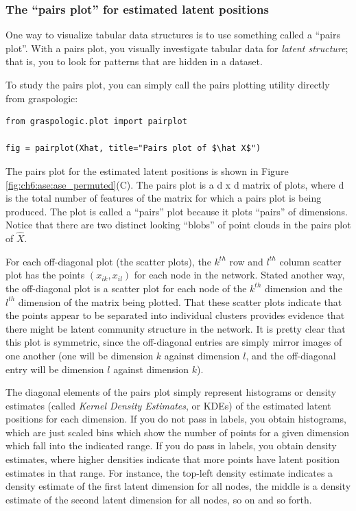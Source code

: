 \subsubsection*{The ``pairs plot'' for estimated latent positions}
\label{sec:ch6:ase:reorder}
One way to visualize tabular data structures is to use something called a ``pairs plot''. With a pairs plot, you visually investigate tabular data for \textit{latent structure}; that is, you to look for patterns that are hidden in a dataset.

To study the pairs plot, you can simply call the pairs plotting utility directly from graspologic:

\begin{lstlisting}[style=python]
from graspologic.plot import pairplot

fig = pairplot(Xhat, title="Pairs plot of $\hat X$")
\end{lstlisting}

The pairs plot for the estimated latent positions is shown in Figure \ref{fig:ch6:ase:ase_permuted}(C). The pairs plot is a d x d matrix of plots, where d is the total number of features of the matrix for which a pairs plot is being produced. The plot is called a ``pairs'' plot because it plots “pairs” of dimensions. Notice that there are two distinct looking ``blobs'' of point clouds in the pairs plot of $\hat X$.

For each off-diagonal plot (the scatter plots), the $k^{th}$ row and $l^{th}$ column scatter plot has the points $(x_{ik}, x_{il})$ for each node in the network. Stated another way, the off-diagonal plot is a scatter plot for each node of the $k^{th}$ dimension and the $l^{th}$ dimension of the matrix being plotted. That these scatter plots indicate that the points appear to be separated into individual clusters provides evidence that there might be latent community structure in the network. It is pretty clear that this plot is symmetric, since the off-diagonal entries are simply mirror images of one another (one will be dimension $k$ against dimension $l$, and the off-diagonal entry will be dimension $l$ against dimension $k$).

The diagonal elements of the pairs plot simply represent histograms or density estimates (called \textit{Kernel Density Estimates}, or KDEs) of the estimated latent positions for each dimension. If you do not pass in labels, you obtain histograms, which are just scaled bins which show the number of points for a given dimension which fall into the indicated range. If you do pass in labels, you obtain density estimates, where higher densities indicate that more points have latent position estimates in that range. For instance, the top-left density estimate indicates a density estimate of the first latent dimension for all nodes, the middle is a density estimate of the second latent dimension for all nodes, so on and so forth.

